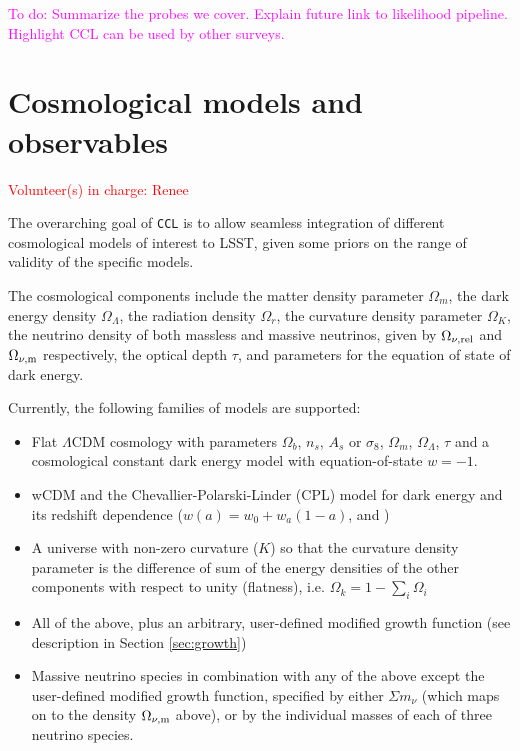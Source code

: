 \documentclass[\docopts]{\docclass}
\newcommand{\todo}[1]{\textcolor{magenta}{To do: #1}}
\newcommand{\vol}[1]{\textcolor{red}{Volunteer(s) in charge: #1}}
\newcommand{\ccl}{{\tt CCL}\xspace}
\begin{document}
\todo{Summarize the probes we cover. Explain future link to likelihood pipeline. Highlight CCL can be used by other surveys.}

\section{Cosmological models and observables}
\vol{Renee}

The overarching goal of \ccl is to allow seamless integration of different cosmological models of interest to LSST, given some priors on the range of validity of the specific models.

The cosmological components include the matter density parameter $\Omega_m$, the dark energy density $\Omega_\Lambda$, the radiation density $\Omega_r$, the curvature density parameter $\Omega_K$, the neutrino density of both massless and massive neutrinos, given by $\Omega_{\nu, {\rm rel}}$ and $\Omega_{\nu, {\rm m}}$ respectively, the optical depth $\tau$, and parameters for the equation of state of dark energy.

Currently, the following families of models are supported:
\begin{itemize}
 \item Flat $\Lambda$CDM cosmology with parameters $\Omega_b$, $n_s$, $A_s$ or $\sigma_8$, $\Omega_m$, $\Omega_\Lambda$, $\tau$ and a cosmological constant dark energy model with equation-of-state $w=-1.$
 \item wCDM and the Chevallier-Polarski-Linder (CPL) model for dark energy and its redshift dependence ($w(a) = w_0+w_a(1-a)$, \citealt{Chevallier01} and \citealt{Linder03})
 \item A universe with non-zero curvature ($K$) so that the curvature density parameter is the difference of sum of the energy densities of the other components with respect to unity (flatness), i.e. $\Omega_k = 1- \sum_i \Omega_i$
 \item All of the above, plus an arbitrary, user-defined modified growth function (see description in Section \ref{sec:growth})
  \item Massive neutrino species in combination with any of the above except the user-defined modified growth function, specified by either $\Sigma m_\nu$ (which maps on to the density $\Omega_{\nu, {\rm m}}$ above), or by the individual masses of each of three neutrino species.
\end{itemize}
\end{document}
